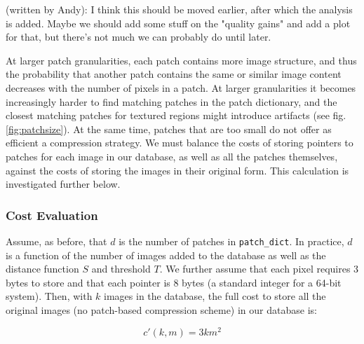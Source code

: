 
\begin{edit}
(written by Andy): I think this should be moved earlier, after which the analysis is added.  Maybe we should add some stuff on the "quality gains" and add a plot for that, but there's not much we can probably do until later.
\end{edit}

At larger patch granularities, each patch contains more image structure, and thus the probability that another patch contains the same or similar image content decreases with the number of pixels in a patch. At larger granularities it becomes increasingly harder to find matching patches in the patch dictionary, and the closest matching patches for textured regions might introduce artifacts (see fig.\ref{fig:patchsize}). At the same time, patches that are too small do not offer as efficient a compression strategy. We must balance the costs of storing pointers to patches for each image in our database, as well as all the patches themselves, against the costs of storing the images in their original form. This calculation is investigated further below. 


\subsubsection{Cost Evaluation}
\label{sec:costeval}

Assume, as before, that $d$ is the number of patches in \texttt{patch\_dict}.  In practice, $d$ is a function of the number of images added to the database as well as the distance function $S$ and threshold $T$.  We further assume that each pixel requires 3 bytes to store and that each pointer is 8 bytes (a standard integer for a 64-bit system).  Then, with $k$ images in the database, the full cost to store all the original images (no patch-based compression scheme) in our database is:

\begin{equation}
	 c'(k, m) = 3  k  m^2
\end{equation}

